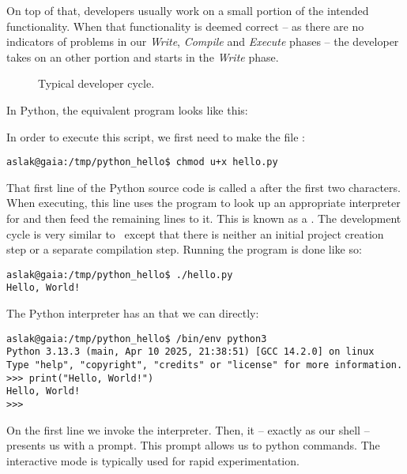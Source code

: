 On top of that, developers usually work on a small portion of the intended functionality. When that functionality is deemed correct -- as there are no indicators of problems in our \textsl{Write}, \textsl{Compile} and \textsl{Execute} phases -- the developer takes on an other portion and starts in the \textsl{Write} phase.

\begin{figure}[tbp]
  
  \caption{Typical developer cycle.}
  \label{fig:first:phases:cycle}
\end{figure}


In Python, the equivalent program looks like this:


In order to execute this script, we first need to make the file :
\begin{verbatim}
aslak@gaia:/tmp/python_hello$ chmod u+x hello.py
\end{verbatim}

That first line of the Python source code is called a  after the first two characters. When executing, this line uses the  program to look up an appropriate interpreter for  and then feed the remaining lines to it. This is known as a . The development cycle is very similar to \csharp\ except that there is neither an initial project creation step or a separate compilation step. Running the program is done like so:

\begin{verbatim}
aslak@gaia:/tmp/python_hello$ ./hello.py
Hello, World!
\end{verbatim}

The Python interpreter has an  that we can  directly:

\begin{verbatim}
aslak@gaia:/tmp/python_hello$ /bin/env python3
Python 3.13.3 (main, Apr 10 2025, 21:38:51) [GCC 14.2.0] on linux
Type "help", "copyright", "credits" or "license" for more information.
>>> print("Hello, World!")
Hello, World!
>>> 
\end{verbatim}

On the first line we invoke the interpreter. Then, it -- exactly as our shell -- presents us with a prompt. This prompt allows us to  python commands. The interactive mode is typically used for rapid experimentation.

